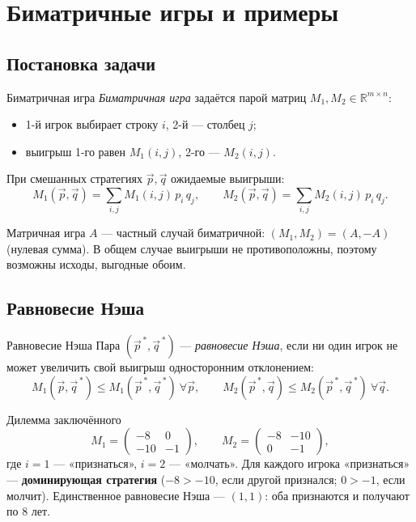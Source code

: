
\section{Биматричные игры и примеры}

\subsection{Постановка задачи}

\begin{Definition}{Биматричная игра}{}
	\emph{Биматричная игра} задаётся парой матриц $M_1,M_2\in\mathbb{R}^{m\times n}$:
	\begin{itemize}
		\item 1-й игрок выбирает строку $i$, 2-й — столбец $j$;
		\item выигрыш 1-го равен $M_1(i,j)$, 2-го — $M_2(i,j)$.
	\end{itemize}
	При смешанных стратегиях $\vec p,\vec q$ ожидаемые выигрыши:
	\[
	M_1(\vec p,\vec q)=\sum_{i,j}M_1(i,j)\,p_i\,q_j,\qquad
	M_2(\vec p,\vec q)=\sum_{i,j}M_2(i,j)\,p_i\,q_j.
	\]
\end{Definition}

\begin{Remark}{}{}
	Матричная игра $A$ — частный случай биматричной: $(M_1,M_2)=(A,-A)$ (нулевая сумма). В общем случае выигрыши не противоположны, поэтому возможны исходы, выгодные обоим.
\end{Remark}

\subsection{Равновесие Нэша}

\begin{Definition}{Равновесие Нэша}{}
	Пара $(\vec p^{\,*},\vec q^{\,*})$ — \emph{равновесие Нэша}, если ни один игрок не может увеличить свой выигрыш односторонним отклонением:
	\[
	M_1(\vec p,\vec q^{\,*})\le M_1(\vec p^{\,*},\vec q^{\,*})\ \forall\vec p,
	\qquad
	M_2(\vec p^{\,*},\vec q)\le M_2(\vec p^{\,*},\vec q^{\,*})\ \forall\vec q.
	\]
\end{Definition}

\begin{Example}{Дилемма заключённого}{}
	\[
	M_1=\begin{pmatrix}-8&0\\-10&-1\end{pmatrix},\qquad
	M_2=\begin{pmatrix}-8&-10\\0&-1\end{pmatrix},
	\]
	где $i=1$ — «признаться», $i=2$ — «молчать». Для каждого игрока «признаться» — \textbf{доминирующая стратегия} ($-8>-10$, если другой признался; $0>-1$, если молчит). Единственное равновесие Нэша — $(1,1)$: оба признаются и получают по $8$ лет.
\end{Example}

